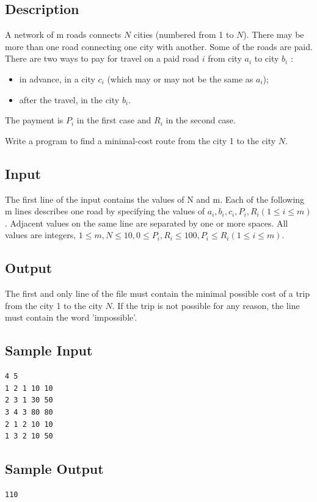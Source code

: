 \documentclass{report}
\begin{document}
\subsection{Description}
A network of m roads connects $N$ cities (numbered from 1 to $N$). There may be more than one road connecting one city with another. Some of the roads are paid. There are two ways to pay for travel on a paid road $i$ from city $a_i$ to city $b_i$ :
\begin{itemize}
    \item in advance, in a city $c_i$ (which may or may not be the same as $a_i$);
    \item after the travel, in the city $b_i$.
\end{itemize}

The payment is $P_i$ in the first case and $R_i$ in the second case.\par

Write a program to find a minimal-cost route from the city 1 to the city $N$.

\subsection{Input}
The first line of the input contains the values of N and m. Each of the following m lines describes one road by specifying the values of $a_i, b_i, c_i, P_i, R_i (1 \leq i \leq m)$. Adjacent values on the same line are separated by one or more spaces. All values are integers, $1 \leq m, N \leq 10, 0 \leq P_i , R_i \leq 100, P_i \leq R_i (1 \leq i \leq m)$.\par

\subsection{Output}
The first and only line of the file must contain the minimal possible cost of a trip from the city 1 to the city $N$. If the trip is not possible for any reason, the line must contain the word 'impossible'.

\subsection{Sample Input}
\begin{lstlisting}
4 5
1 2 1 10 10
2 3 1 30 50
3 4 3 80 80
2 1 2 10 10
1 3 2 10 50
\end{lstlisting}

\subsection{Sample Output}
\begin{lstlisting}
110
\end{lstlisting}
\end{document}
